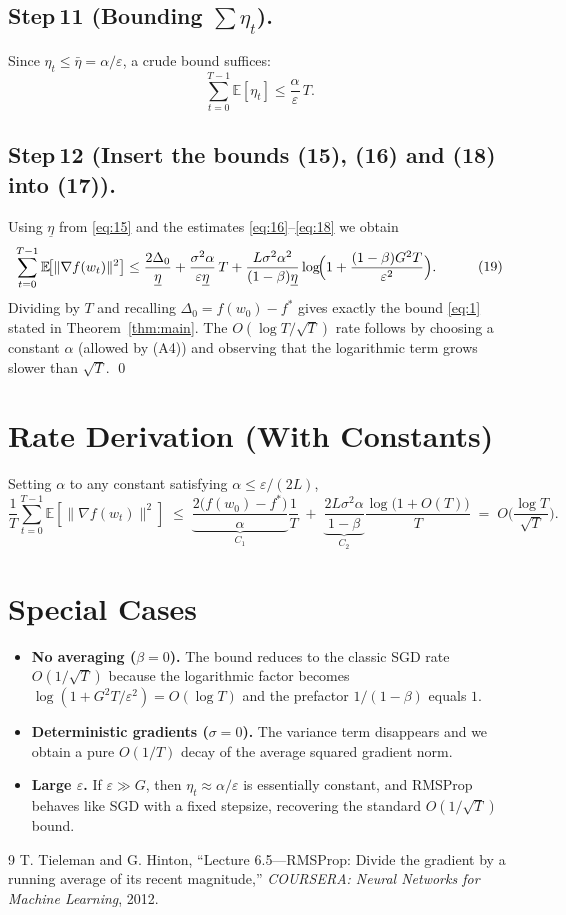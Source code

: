 \documentclass[11pt]{article}
\newcommand{\E}{\mathbb{E}}
\begin{document}
\subsection*{Step 11 (Bounding $\sum\eta_t$).}
Since $\eta_t\le\bar\eta=\alpha/\varepsilon$, a crude bound suffices:
\[
\sum_{t=0}^{T-1}\E[\eta_t]\le \frac{\alpha}{\varepsilon}\,T . \tag{18}
\]

\subsection*{Step 12 (Insert the bounds (15), (16) and (18) into (17)).}
Using $\underline\eta$ from \eqref{eq:15} and the estimates \eqref{eq:16}–\eqref{eq:18} we obtain
\[
\begin{aligned}
\sum_{t=0}^{T-1}\E\!\big[\|\nabla f(w_t)\|^{2}\big]
&\le
\frac{2\Delta_{0}}{\underline\eta}
   +\frac{\sigma^{2}\alpha}{\varepsilon\underline\eta}\,T
   +\frac{L\sigma^{2}\alpha^{2}}{(1-\beta)\underline\eta}
     \log\!\Bigl(1+\frac{(1-\beta)G^{2}T}{\varepsilon^{2}}\Bigr) .
\end{aligned}
\tag{19}
\]
Dividing by $T$ and recalling $\Delta_{0}=f(w_0)-f^{*}$ gives exactly the bound \eqref{eq:1} stated in Theorem~\ref{thm:main}.  The $O(\log T/\sqrt{T})$ rate follows by choosing a constant $\alpha$ (allowed by (A4)) and observing that the logarithmic term grows slower than $\sqrt{T}$.  \qed

\section*{Rate Derivation (With Constants)}
Setting $\alpha$ to any constant satisfying $\alpha\le\varepsilon/(2L)$,
\[
\frac{1}{T}\sum_{t=0}^{T-1}\E[\|\nabla f(w_t)\|^{2}]
\;\le\;
\underbrace{\frac{2\big(f(w_0)-f^{*}\big)}{\alpha}}_{C_{1}}\frac{1}{T}
\;+\;
\underbrace{\frac{2L\sigma^{2}\alpha}{1-\beta}}_{C_{2}}
\frac{\log\!\big(1+O(T)\big)}{T}
\;=\;
O\!\bigg(\frac{\log T}{\sqrt{T}}\bigg).
\]

\section*{Special Cases}
\begin{itemize}
\item \textbf{No averaging ($\beta=0$).}  The bound reduces to the classic SGD rate $O(1/\sqrt{T})$ because the logarithmic factor becomes $\log(1+G^{2}T/\varepsilon^{2})=O(\log T)$ and the prefactor $1/(1-\beta)$ equals $1$.
\item \textbf{Deterministic gradients ($\sigma=0$).}  The variance term disappears and we obtain a pure $O(1/T)$ decay of the average squared gradient norm.
\item \textbf{Large $\varepsilon$.}  If $\varepsilon\gg G$, then $\eta_t\approx\alpha/\varepsilon$ is essentially constant, and RMSProp behaves like SGD with a fixed stepsize, recovering the standard $O(1/\sqrt{T})$ bound.
\end{itemize}

\begin{thebibliography}{9}
T. Tieleman and G. Hinton, ``Lecture 6.5—RMSProp: Divide the gradient by a running average of its recent magnitude,'' \emph{COURSERA: Neural Networks for Machine Learning}, 2012.
\end{thebibliography}
\end{document}
